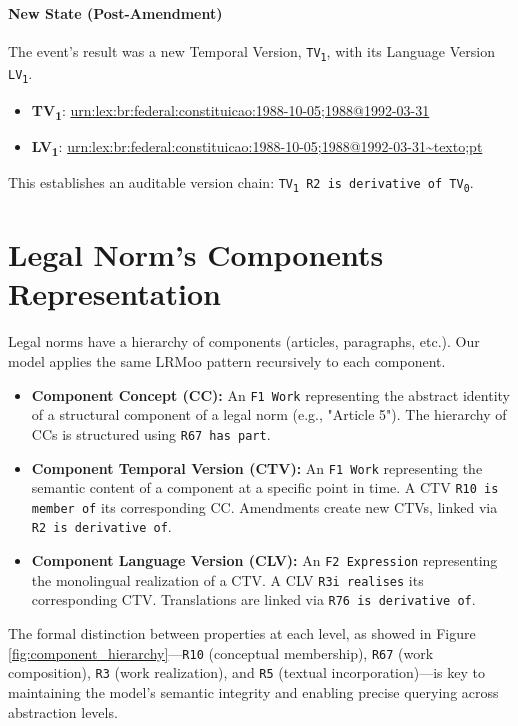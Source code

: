 \documentclass[11pt]{article}
\begin{document}
\paragraph{New State (Post-Amendment)}
The event's result was a new Temporal Version, \texttt{TV\textsubscript{1}}, with its Language Version \texttt{LV\textsubscript{1}}.
\begin{itemize}
\item \textbf{TV\textsubscript{1}}: \url{urn:lex:br:federal:constituicao:1988-10-05;1988@1992-03-31}
\item \textbf{LV\textsubscript{1}}: \url{urn:lex:br:federal:constituicao:1988-10-05;1988@1992-03-31~texto;pt}
\end{itemize}
This establishes an auditable version chain: \texttt{TV\textsubscript{1} R2 is derivative of TV\textsubscript{0}}.

\section{Legal Norm’s Components Representation}
\label{legal_norm_component_representation}
Legal norms have a hierarchy of components (articles, paragraphs, etc.). Our model applies the same LRMoo pattern recursively to each component.

\begin{itemize}
    \item \textbf{Component Concept (CC):} An \texttt{F1 Work} 
    representing the abstract identity of a structural component of a legal norm 
    (e.g., "Article 5"). The hierarchy of CCs is structured using 
    \texttt{R67 has part}.
    
    \item \textbf{Component Temporal Version (CTV):} An \texttt{F1 Work} 
    representing the semantic content of a component at a specific point in time. 
    A CTV \texttt{R10 is member of} its corresponding CC. Amendments create new 
    CTVs, linked via \texttt{R2 is derivative of}.
    
    \item \textbf{Component Language Version (CLV):} An \texttt{F2 Expression} 
    representing the monolingual realization of a CTV. A CLV \texttt{R3i realises} 
    its corresponding CTV. Translations are linked via \texttt{R76 is derivative of}.
\end{itemize}

The formal distinction between properties at each level, as showed in Figure \ref{fig:component_hierarchy}---\texttt{R10} 
(conceptual membership), \texttt{R67} (work composition), \texttt{R3} 
(work realization), and \texttt{R5} (textual incorporation)---is key to 
maintaining the model's semantic integrity and enabling precise querying 
across abstraction levels.
\end{document}
